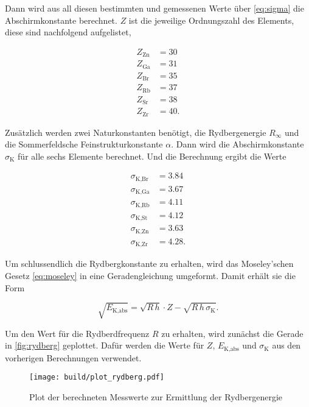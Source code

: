 Dann wird aus all diesen bestimmten und gemessenen Werte über \eqref{eq:sigma} die Abschirmkonstante berechnet.
$Z$ ist die jeweilige Ordnungszahl des Elements, diese sind nachfolgend aufgelistet,

\begin{align*}
    Z_\text{Zn} &= 30\\
    Z_\text{Ga} &= 31\\
    Z_\text{Br} &= 35\\
    Z_\text{Rb} &= 37\\
    Z_\text{Sr} &= 38\\
    Z_\text{Zr} &= 40.
\end{align*}

Zusätzlich werden zwei Naturkonstanten benötigt, die Rydbergenergie $R_\infty$ und die Sommerfeldsche Feinstrukturkonstante $\alpha$. \cite{physics_constants}
Dann wird die Abschirmkonstante $\sigma _\text{K}$ für alle sechs Elemente berechnet.
Und die Berechnung ergibt die Werte

\begin{align*}
    \sigma_\text{K,Br} &= 3.84\\
    \sigma_\text{K,Ga} &= 3.67\\
    \sigma_\text{K,Rb} &= 4.11\\
    \sigma_\text{K,St} &= 4.12\\
    \sigma_\text{K,Zn} &= 3.63\\
    \sigma_\text{K,Zr} &= 4.28.
\end{align*}

Um schlussendlich die Rydbergkonstante zu erhalten, wird das Moseley'schen Gesetz \eqref{eq:moseley} in eine Geradengleichung umgeformt.
Damit erhält sie die Form 

\begin{equation}
    \sqrt{E_\text{K,abs}} = \sqrt{R \, h} \cdot Z - \sqrt{R \, h \, \sigma_\text{K}}.
    \label{eq:ding}
\end{equation}

Um den Wert für die Rydberdfrequenz $R$ zu erhalten, wird zunächst die Gerade in \autoref{fig:rydberg} geplottet.
Dafür werden die Werte für $Z$, $E_\text{K,abs}$ und $\sigma_\text{K}$ aus den vorherigen Berechnungen verwendet.

\begin{figure}
    \centering
    \texttt{[image: build/plot\_rydberg.pdf]}
    \caption{Plot der berechneten Messwerte zur Ermittlung der Rydbergenergie}
    \label{fig:rydberg}
\end{figure}


